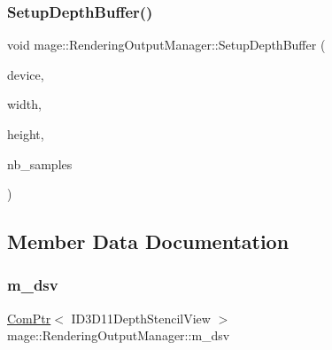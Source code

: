 \hypertarget{classmage_1_1_rendering_output_manager_aa477546b3768a1a3679490d17d466e44}{}\label{classmage_1_1_rendering_output_manager_aa477546b3768a1a3679490d17d466e44} 
\subsubsection{\texorpdfstring{Setup\+Depth\+Buffer()}{SetupDepthBuffer()}}
{\footnotesize\ttfamily void mage\+::\+Rendering\+Output\+Manager\+::\+Setup\+Depth\+Buffer (\begin{DoxyParamCaption}\item[{I\+D3\+D11\+Device5 $\ast$}]{device,  }\item[{\hyperlink{namespacemage_a41c104c036fba3756a74e19f793eeaa1}{U32}}]{width,  }\item[{\hyperlink{namespacemage_a41c104c036fba3756a74e19f793eeaa1}{U32}}]{height,  }\item[{\hyperlink{namespacemage_a41c104c036fba3756a74e19f793eeaa1}{U32}}]{nb\+\_\+samples }\end{DoxyParamCaption})\hspace{0.3cm}{\ttfamily [private]}}



\subsection{Member Data Documentation}
\hypertarget{classmage_1_1_rendering_output_manager_a3c6290fd9b186fbe56a47adb6d774ccf}{}\label{classmage_1_1_rendering_output_manager_a3c6290fd9b186fbe56a47adb6d774ccf} 
\subsubsection{\texorpdfstring{m\+\_\+dsv}{m\_dsv}}
{\footnotesize\ttfamily \hyperlink{namespacemage_ae74f374780900893caa5555d1031fd79}{Com\+Ptr}$<$ I\+D3\+D11\+Depth\+Stencil\+View $>$ mage\+::\+Rendering\+Output\+Manager\+::m\+\_\+dsv\hspace{0.3cm}{\ttfamily [private]}}

